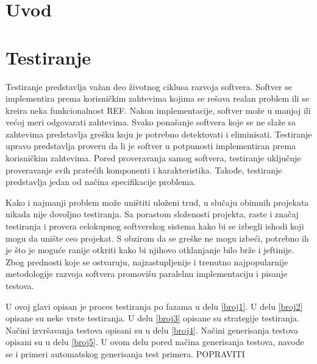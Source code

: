 \documentclass[12pt,oneside]{memoir}
\begin{document}
\frontmatter
\naslovna
\komisija
\apstrakt
\tableofcontents*

\mainmatter

\chapter{Uvod}


\chapter{Testiranje}

Testiranje predstavlja važan deo životnog ciklusa razvoja softvera. Softver se implementira prema korisničkim zahtevima kojima se rešava realan problem ili se kreira neka funkcionalnost REF. Nakon implementacije, softver može u manjoj ili većoj meri odgovarati zahtevima. Svako ponašanje softvera koje se ne slaže sa zahtevima predstavlja grešku koju je potrebno detektovati i eliminisati. Testiranje upravo predstavlja proveru da li je softver u potpunosti implementiran prema korisničkim zahtevima. Pored proveravanja samog softvera, testiranje uključuje proveravanje svih pratećih komponenti i karakteristika. Takođe, testiranje predstavlja jedan od načina specifikacije problema.
\par
Kako i najmanji problem može uništiti uloženi trud, u slučaju obimnih projekata nikada nije dovoljno testiranja. Sa porastom složenosti projekta, raste i značaj testiranja i provera celokupnog softverskog sistema kako bi se izbegli ishodi koji mogu da unište ceo projekat. 
S obzirom da se greške ne mogu izbeći, potrebno ih je što je moguće ranije otkriti kako bi njihovo otklanjanje bilo brže i jeftinije. Zbog prednosti koje se ostvaruju, najzastupljenije i trenutno najpopularnije metodologije razvoja softvera promovišu paralelnu implementaciju i pisanje testova.
\par 
U ovoj glavi opisan je proces testiranja po fazama u delu \ref{broj1}. U delu \ref{broj2} opisane su neke vrste testiranja. U delu \ref{broj3} opisane su strategije testiranja. Načini izvršavanja testova opisani su u delu \ref{broj4}. Načini generisanja testova opisani su u delu \ref{broj5}. U ovom delu pored načina generisanja testova, navode se i primeri automatskog generisanja test primera. POPRAVITI
\end{document}

